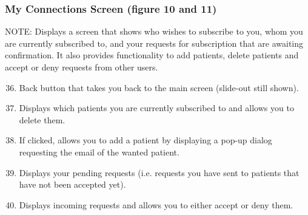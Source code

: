 \subsubsection{My Connections Screen (figure 10 and 11)}
NOTE: Displays a screen that shows who wishes to subscribe to you, whom you are currently subscribed to, and your requests for subscription that are awaiting confirmation. It also provides functionality to add patients, delete patients and accept or deny requests from other users. 
\begin{enumerate}
\setcounter{enumi}{35}
	\item Back button that takes you back to the main screen (slide-out still shown). 
	\item Displays which patients you are currently subscribed to and allows you to delete them. 
	\item If clicked, allows you to add a patient by displaying a pop-up dialog requesting the email of the wanted patient. 
	\item Displays your pending requests (i.e. requests you have sent to patients that have not been accepted yet). 
    \item Displays incoming requests and allows you to either accept or deny them. 
\end{enumerate}
%
